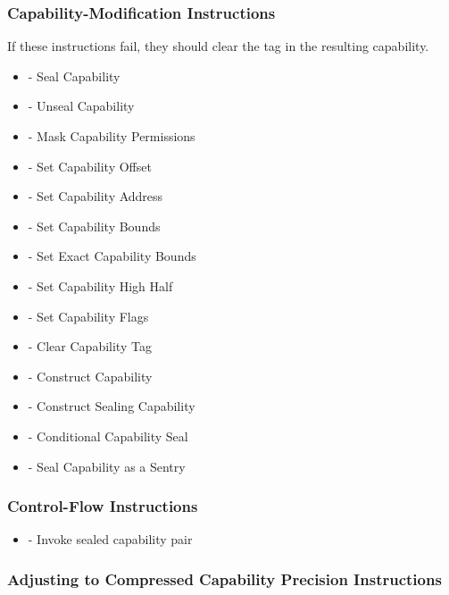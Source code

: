 \subsubsection{Capability-Modification Instructions}

If these instructions fail, they should clear the tag in the resulting
capability.

\begin{itemize}
  \item {} - Seal Capability
  \item {} - Unseal Capability
  \item {} - Mask Capability Permissions
  \item {} - Set Capability Offset
  \item {} - Set Capability Address
  \item {} - Set Capability Bounds
  \item {} - Set Exact Capability Bounds
  \item {} - Set Capability High Half
  \item {} - Set Capability Flags
  \item {} - Clear Capability Tag
  \item {} - Construct Capability
  \item {} - Construct Sealing Capability
  \item {} - Conditional Capability Seal
  \item {} - Seal Capability as a Sentry
\end{itemize}

\subsubsection{Control-Flow Instructions}

\begin{itemize}
  \item {} - Invoke sealed capability pair
\end{itemize}

\subsubsection{Adjusting to Compressed Capability Precision
  Instructions}

